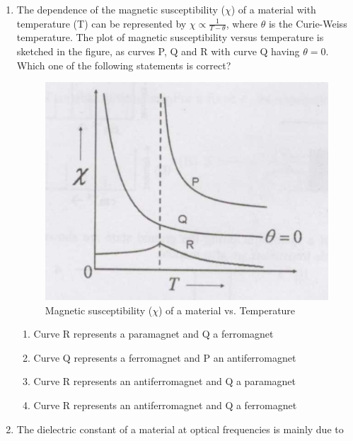 \documentclass[14pt, a4paper]{extarticle}
\begin{document}
\begin{enumerate}[label=\textbf{Q. \arabic*}, start=21]
\item The dependence of the magnetic susceptibility ($\chi$) of a material with temperature (T) can be represented by $\chi \propto \frac{1}{T-\theta}$, where $\theta$ is the Curie-Weiss temperature.
The plot of magnetic susceptibility versus temperature is sketched in the figure, as curves P, Q and R with curve Q having $\theta=0$.
Which one of the following statements is correct?
\begin{figure}[H]
\centering
\includegraphics[width=0.5\columnwidth]{figs/Q27figs.png}
\caption{Magnetic susceptibility ($\chi$) of a material vs. Temperature}
\label{fig:q27}
\end{figure}
\begin{enumerate}[label=(\Alph*)]
\item Curve R represents a paramagnet and Q a ferromagnet
\item Curve Q represents a ferromagnet and P an antiferromagnet
\item Curve R represents an antiferromagnet and Q a paramagnet
\item Curve R represents an antiferromagnet and Q a ferromagnet
\end{enumerate}

\item The dielectric constant of a material at optical frequencies is mainly due to
\begin{enumerate}[label=(\Alph*)]
\end{enumerate}


\end{enumerate}
\end{document}

